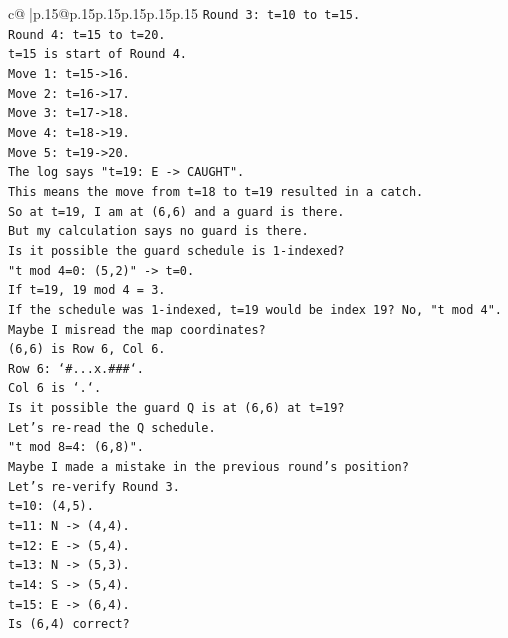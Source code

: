 \documentclass{article}
\begin{document}
{\begin{supertabular}{c@{$\;$}|p{.15\linewidth}@{}p{.15\linewidth}p{.15\linewidth}p{.15\linewidth}p{.15\linewidth}p{.15\linewidth}}
{{{\texttt{Round 3: t=10 to t=15.} \\
\texttt{Round 4: t=15 to t=20.} \\
\texttt{t=15 is start of Round 4.} \\
\texttt{Move 1: t=15{-}>16.} \\
\texttt{Move 2: t=16{-}>17.} \\
\texttt{Move 3: t=17{-}>18.} \\
\texttt{Move 4: t=18{-}>19.} \\
\texttt{Move 5: t=19{-}>20.} \\
\texttt{The log says "t=19: E {-}> CAUGHT".} \\
\texttt{This means the move from t=18 to t=19 resulted in a catch.} \\
\texttt{So at t=19, I am at (6,6) and a guard is there.} \\
\texttt{But my calculation says no guard is there.} \\
\texttt{Is it possible the guard schedule is 1{-}indexed?} \\
\texttt{"t mod 4=0: (5,2)" {-}> t=0.} \\
\texttt{If t=19, 19 mod 4 = 3.} \\
\texttt{If the schedule was 1{-}indexed, t=19 would be index 19? No, "t mod 4".} \\
\texttt{Maybe I misread the map coordinates?} \\
\texttt{(6,6) is Row 6, Col 6.} \\
\texttt{Row 6: `\#...x.\#\#\#`.} \\
\texttt{Col 6 is `.`.} \\
\texttt{Is it possible the guard Q is at (6,6) at t=19?} \\
\texttt{Let's re{-}read the Q schedule.} \\
\texttt{"t mod 8=4: (6,8)".} \\
\texttt{Maybe I made a mistake in the previous round's position?} \\
\texttt{Let's re{-}verify Round 3.} \\
\texttt{t=10: (4,5).} \\
\texttt{t=11: N {-}> (4,4).} \\
\texttt{t=12: E {-}> (5,4).} \\
\texttt{t=13: N {-}> (5,3).} \\
\texttt{t=14: S {-}> (5,4).} \\
\texttt{t=15: E {-}> (6,4).} \\
\texttt{Is (6,4) correct?} \\
}}}
\end{supertabular}}
\end{document}
